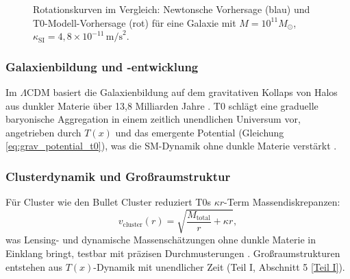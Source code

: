 \documentclass[twocolumn,aps,prl]{revtex4-2}
\newcommand{\Tfield}{T(x)}
\newcommand{\LCDM}{\Lambda\text{CDM}}
\begin{document}
	\begin{figure}[ht]
		\centering
		\caption{Rotationskurven im Vergleich: Newtonsche Vorhersage (blau) und T0-Modell-Vorhersage (rot) für eine Galaxie mit \(M = 10^{11} M_{\odot}\), \(\kappa_{\text{SI}} = 4,8 \times 10^{-11} \, \text{m/s}^2\).}
		\label{fig:rotation_curves}
	\end{figure}
	
	\subsubsection{Galaxienbildung und -entwicklung}
	Im \(\LCDM\) basiert die Galaxienbildung auf dem gravitativen Kollaps von Halos aus dunkler Materie über 13,8 Milliarden Jahre \cite{Planck2020}. T0 schlägt eine graduelle baryonische Aggregation in einem zeitlich unendlichen Universum vor, angetrieben durch \(\Tfield\) und das emergente Potential (Gleichung \ref{eq:grav_potential_t0}), was die SM-Dynamik ohne dunkle Materie verstärkt \cite{pascher_galaxies_2025}.
	
	\subsubsection{Clusterdynamik und Großraumstruktur}
	Für Cluster wie den Bullet Cluster reduziert T0s \(\kappa r\)-Term Massendiskrepanzen:
	\begin{equation}
		v_{\text{cluster}}(r) = \sqrt{\frac{M_{\text{total}}}{r} + \kappa r},
		\label{eq:cluster_velocity}
	\end{equation}
	was Lensing- und dynamische Massenschätzungen ohne dunkle Materie in Einklang bringt, testbar mit präzisen Durchmusterungen \cite{pascher_emergente_2025}. Großraumstrukturen entstehen aus \(\Tfield\)-Dynamik mit unendlicher Zeit (Teil I, Abschnitt 5 \href{https://github.com/jpascher/T0-Time-Mass-Duality/tree/main/2/pdf/Deutsch/QMRelTimeMassPart1.pdf}{[Teil I]}).
	
\end{document}
